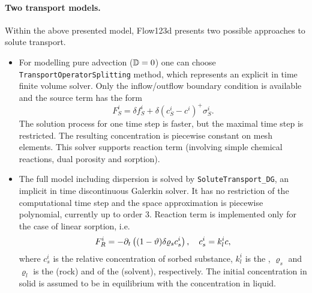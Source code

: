 \paragraph{Two transport models.}
Within the above presented model, Flow123d presents two possible approaches to solute transport.
\begin{itemize}
\item For modelling pure advection (${\mathbb{D}}=0$) one can choose {\tt TransportOperatorSplitting} method, which represents an explicit in time finite volume solver. 
Only the inflow/outflow boundary condition is available and the source term has the form
\[ F_S^i = \delta f_S^i + \delta(c_S^i-c^i)^+\sigma_S^i. \]
The solution process for one time step is faster, but the maximal time step is restricted. The resulting concentration is piecewise constant on mesh elements. This solver supports reaction term (involving simple chemical reactions, dual porosity and sorption).
\item The full model including dispersion is solved by {\tt SoluteTransport\_DG}, an implicit in time discontinuous Galerkin solver. It has no restriction of the computational time step and the space approximation is piecewise polynomial, currently up to order 3.
Reaction term is implemented only for the case of linear sorption, i.e.
\[ F_R^i = -\partial_t\left((1-\vartheta)\delta \varrho_s c_s^i\right), \quad c_s^i = k_l^i c, \]
where $c_s^i$ \units{}{}{} is the relative concentration of sorbed substance, $k_l^i$  is the , $\varrho_s$ and $\varrho_l$  is the  (rock) and of the  (solvent), respectively.
The initial concentration in solid is assumed to be in equilibrium with the concentration in liquid. 
\end{itemize}


